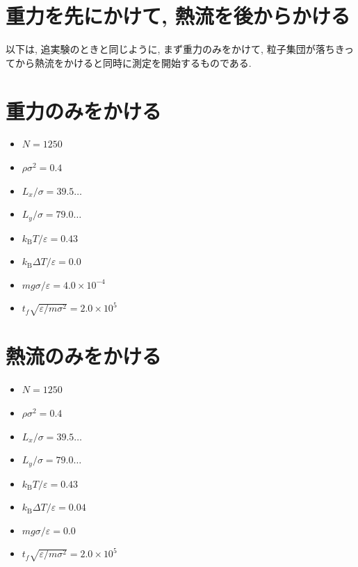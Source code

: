 \section{重力を先にかけて, 熱流を後からかける}

以下は, 追実験のときと同じように, まず重力のみをかけて, 粒子集団が落ちきってから熱流をかけると同時に測定を開始するものである.





\section{重力のみをかける}

\begin{itemize}
  \item $N = 1250$
  \item $\rho {\sigma}^2 = 0.4$
  \item $L_x / \sigma = 39.5\dots$
  \item $L_y / \sigma = 79.0\dots$
  \item $k_{\text{B}} T / \varepsilon = 0.43$
  \item $k_{\text{B}} \Delta T / \varepsilon = 0.0$
  \item $mg\sigma/\varepsilon = 4.0 \times 10^{-4}$
  \item $t_f \sqrt{\varepsilon / m \sigma^2} = 2.0 \times 10^{5}$
\end{itemize}



\section{熱流のみをかける}

\begin{itemize}
  \item $N = 1250$
  \item $\rho {\sigma}^2 = 0.4$
  \item $L_x / \sigma = 39.5\dots$
  \item $L_y / \sigma = 79.0\dots$
  \item $k_{\text{B}} T / \varepsilon = 0.43$
  \item $k_{\text{B}} \Delta T / \varepsilon = 0.04$
  \item $mg\sigma/\varepsilon = 0.0$
  \item $t_f \sqrt{\varepsilon / m \sigma^2} = 2.0 \times 10^{5}$
\end{itemize}

